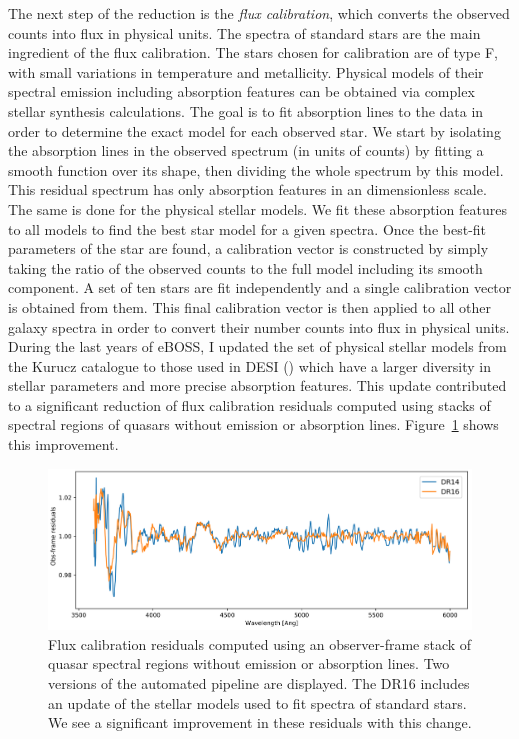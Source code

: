 The next step of the reduction is the \emph{flux calibration}, 
which converts the observed counts into flux in physical units. 
The spectra of standard stars are the main ingredient of the flux calibration. 
The stars chosen for calibration are of type F, with small variations in 
temperature and metallicity. Physical models of their spectral emission 
including absorption features can be obtained via complex stellar synthesis calculations. 
The goal is to fit absorption lines to the data 
in order to determine the exact model for each observed star. 
We start by isolating the absorption lines in the observed spectrum 
(in units of counts) by fitting a smooth function over its shape, 
then dividing the whole spectrum by this model. 
This residual spectrum has only absorption features in an dimensionless scale.
The same is done for the physical stellar models. We fit these absorption features 
to all models to find the best star model for a given spectra.
Once the best-fit parameters of the star are found, 
a calibration vector is constructed by simply taking the ratio of 
the observed counts to the full model including its smooth component. 
A set of ten stars are fit independently and a single calibration 
vector is obtained from them. This final calibration vector is then 
applied to all other galaxy spectra in order to convert their number counts into
flux in physical units. During the last years of eBOSS, I updated 
the set of physical stellar models from the Kurucz catalogue to those used 
in DESI (\cite{allendeprietoCollectionModelStellar2018}) 
which have a larger diversity in stellar 
parameters and more precise absorption features. This update contributed
to a significant reduction of flux calibration residuals 
computed using stacks of spectral regions of quasars without emission 
or absorption lines. Figure~\ref{fig:flux_calibration_residuals} shows this 
improvement. 

\begin{figure}[t]
    \centering
    \includegraphics[width=\textwidth]{fig/spectro/picca_calibration_residuals_DR14_DR16_civ.png}
    \caption{Flux calibration residuals computed using an observer-frame stack of 
    quasar spectral regions without emission or absorption lines. 
    Two versions of the automated pipeline are displayed. The DR16 includes an 
    update of the stellar models used to fit spectra of standard stars. 
    We see a significant improvement in these residuals with this change. }
    \label{fig:flux_calibration_residuals}
\end{figure}

